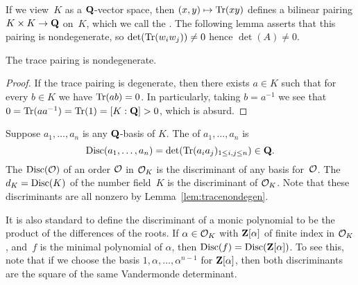 If we view~$K$ as a $\mathbf{Q}$-vector space, then $(x,y)\mapsto \operatorname{Tr}(xy)$
defines a bilinear pairing $K\times K \to \mathbf{Q}$ on~$K$, which we call
the .  The following lemma asserts that this
pairing is nondegenerate, so $\det(\operatorname{Tr}(w_i w_j))\neq 0$ hence
$\det(A)\neq 0$.
\begin{lemma}\label{lem:tracenondegen}
The trace pairing is nondegenerate.
\end{lemma}
\begin{proof}
If the trace pairing is degenerate, then there exists $a\in K$ such
that for every $b\in K$ we have $\operatorname{Tr}(ab)=0$.  In particularly, taking
$b=a^{-1}$ we see that $0=\operatorname{Tr}(a a^{-1})=\operatorname{Tr}(1)=[K:\mathbf{Q}]>0$, which is
absurd.
\end{proof}

\begin{definition}[Discriminant]\label{def:disc}
Suppose $a_1,\ldots, a_n$ is any $\mathbf{Q}$-basis of $K$.  The 
of $a_1,\ldots, a_n$ is 
$$
  \operatorname{Disc}(a_1,\ldots,a_n) = \det(\operatorname{Tr}(a_i a_j)_{1\leq i,j\leq n})\in\mathbf{Q}.
$$
The  $\operatorname{Disc}(\mathcal{O})$ of an order $\mathcal{O}$ in $\mathcal{O}_K$ is
the discriminant of any basis for~$\mathcal{O}$.
The  $d_K=\operatorname{Disc}(K)$ of the number field~$K$ 
is the discriminant of $\mathcal{O}_K$. 
Note that these discriminants are all nonzero
by Lemma~\ref{lem:tracenondegen}.
\end{definition}

\begin{remark}
  It is also standard to define the discriminant of a monic polynomial
  to be the product of the differences of the roots.  If $\alpha\in
  \mathcal{O}_K$ with $\mathbf{Z}[\alpha]$ of finite index in $\mathcal{O}_K$, and~$f$ is the
  minimal polynomial of $\alpha$, then $\operatorname{Disc}(f)=\operatorname{Disc}(\mathbf{Z}[\alpha])$.
  To see this, note that if we choose the basis
  $1,\alpha,\ldots,\alpha^{n-1}$ for $\mathbf{Z}[\alpha]$, then both
  discriminants are the square of the same Vandermonde determinant.
\end{remark}

